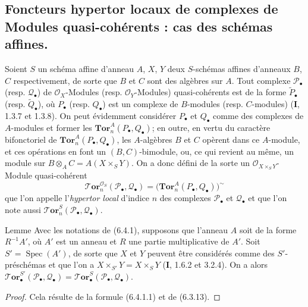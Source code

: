 \subsection{Foncteurs hypertor locaux de complexes de Modules quasi-cohérents : cas des schémas affines.}

\begin{env}[6.4.1]
Soient $S$ un schéma affine d'anneau $A$, $X$, $Y$ deux $S$-schémas affines
d'anneaux $B$, $C$ respectivement, de sorte que $B$ et $C$ sont des algèbres
sur $A$. Tout complexe $\mathscr P_\bullet$ (resp. $\mathscr Q_\bullet$) de
$\mathscr O_X$-Modules (resp. $\mathscr O_Y$-Modules) quasi-cohérents est de
la forme $\widetilde{P}_\bullet$ (resp. $\widetilde{Q}_\bullet$), où
$P_\bullet$ (resp. $Q_\bullet$) est un complexe de $B$-modules (resp.
$C$-modules) (\textbf{I}, 1.3.7 et 1.3.8). On peut évidemment considérer $P_\bullet$
et $Q_\bullet$ comme des complexes de $A$-modules et former les
$\mathbf{Tor}_n^A(P_\bullet,Q_\bullet)$; en outre, en vertu du caractère
bifonctoriel de $\mathbf{Tor}_n^A(P_\bullet,Q_\bullet)$, les $A$-algèbres
$B$ et $C$ opèrent dans ce $A$-module, et ces opérations en font un
$(B,C)$-bimodule, ou, ce qui revient au même, un module sur
$B\otimes_A C=A(X\times_S Y)$. On a donc défini de la sorte un
$\mathscr O_{X\times_S Y}$-Module quasi-cohérent
\[
  \boldsymbol{\mathscr{T}\!or}_n^{\mathscr O_S}(\mathscr P_\bullet,\mathscr Q_\bullet)
  =\bigl(\mathbf{Tor}_n^A(P_\bullet,Q_\bullet)\bigr)^{\sim}
  \tag{6.4.1.1}\label{III.6.4.1.1.fr}
\]
que l'on appelle l'\emph{hypertor local} d'indice $n$ des complexes
$\mathscr P_\bullet$ et $\mathscr Q_\bullet$ et que l'on note aussi
$\boldsymbol{\mathscr{T}\!or}_n^S(\mathscr P_\bullet,\mathscr Q_\bullet)$.
\end{env}

\begin{namedtheorem}[6.4.2]{Lemme}
Avec les notations de \textup{(6.4.1)}, supposons que l'anneau $A$ soit de la forme
$R^{-1}A'$, où $A'$ est un anneau et $R$ une partie multiplicative de $A'$.
Soit $S'=\operatorname{Spec}(A')$, de sorte que $X$ et $Y$ peuvent être
considérés comme des $S'$-préschémas et que l'on a
$X\times_{S'}Y=X\times_S Y$ \textup{(\textbf{I}, 1.6.2} et \textup{3.2.4)}. On a alors
$\boldsymbol{\mathscr{T}\!or}_\bullet^{S'}(\mathscr P_\bullet,\mathscr Q_\bullet)
=\boldsymbol{\mathscr{T}\!or}_\bullet^S(\mathscr P_\bullet,\mathscr Q_\bullet)$.
\end{namedtheorem}

\begin{proof}
Cela résulte de la formule (6.4.1.1) et de (6.3.13).
\end{proof}

